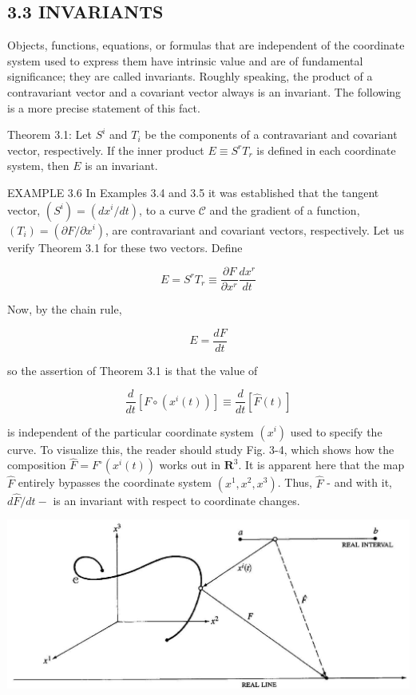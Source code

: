 \documentclass[10pt]{article}
\begin{document}
\subsection*{3.3 INVARIANTS}
Objects, functions, equations, or formulas that are independent of the coordinate system used to express them have intrinsic value and are of fundamental significance; they are called invariants. Roughly speaking, the product of a contravariant vector and a covariant vector always is an invariant. The following is a more precise statement of this fact.

Theorem 3.1: Let $S^{i}$ and $T_{i}$ be the components of a contravariant and covariant vector, respectively. If the inner product $E \equiv S^{r} T_{r}$ is defined in each coordinate system, then $E$ is an invariant.

EXAMPLE 3.6 In Examples 3.4 and 3.5 it was established that the tangent vector, $\left(S^{i}\right)=\left(d x^{i} / d t\right)$, to a curve $\mathscr{C}$ and the gradient of a function, $\left(T_{i}\right)=\left(\partial F / \partial x^{i}\right)$, are contravariant and covariant vectors, respectively. Let us verify Theorem 3.1 for these two vectors. Define

$$
E=S^{r} T_{r} \equiv \frac{\partial F}{\partial x^{r}} \frac{d x^{r}}{d t}
$$

Now, by the chain rule,

$$
E=\frac{d F}{d t}
$$

so the assertion of Theorem 3.1 is that the value of

$$
\frac{d}{d t}\left[F \circ\left(x^{i}(t)\right)\right] \equiv \frac{d}{d t}[\hat{F}(t)]
$$

is independent of the particular coordinate system $\left(x^{i}\right)$ used to specify the curve. To visualize this, the reader should study Fig. 3-4, which shows how the composition $\hat{F}=F^{\circ}\left(x^{i}(t)\right)$ works out in $\mathbf{R}^{3}$. It is apparent here that the map $\hat{F}$ entirely bypasses the coordinate system $\left(x^{1}, x^{2}, x^{3}\right)$. Thus, $\hat{F}$ - and with it, $d \hat{F} / d t-$ is an invariant with respect to coordinate changes.

\begin{center}
\includegraphics[max width=\textwidth]{2024_04_03_41f90be4f896e21f0dc9g-037}
\end{center}
\end{document}
